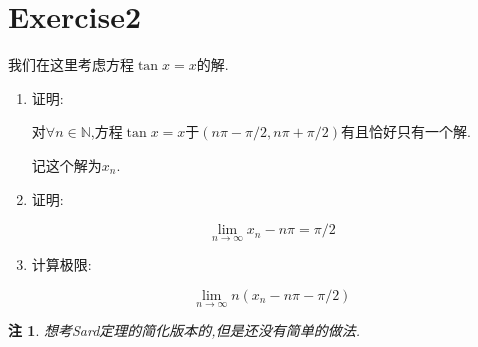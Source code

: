 \documentclass{ctexart}
\newtheorem{re}{注}
\begin{document}
	\section{Exercise2} 
		我们在这里考虑方程$\tan x=x$的解.
\begin{enumerate}

	\item

证明:

对$\forall n \in \mathbb{N}$,方程$\tan x=x$于$(n\pi-\pi /2, n\pi+\pi /2)$有且恰好只有一个解.

记这个解为$x_n$.
	
		\item
证明:
	
	$$\lim\limits_{n \rightarrow \infty}x_n-n\pi=\pi/2$$
	
			\item
	
计算极限:

$$\lim\limits_{n \rightarrow \infty}n(x_n-n\pi-\pi/2)$$
\end{enumerate}
\begin{re}
想考Sard定理的简化版本的,但是还没有简单的做法.
\end{re}
\end{document}
